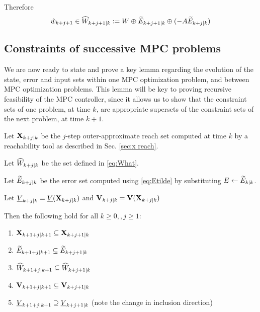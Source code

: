 Therefore 
\begin{equation}
\label{eq:What}
\hat{w}_{k+j+1} \in \widehat{W}_{k+j+1|k} := W \oplus \widetilde{E}_{k+j+1|k} \oplus(-A\widetilde{E}_{k+j|k})
\end{equation}

\subsection{Constraints of successive MPC problems}
\label{sec:inclusions statement}
We are now ready to state and prove a key lemma regarding the evolution of the state, error and input sets within one MPC optimization problem, and between MPC optimization problems. 
This lemma will be key to proving recursive feasibility of the MPC controller, since it allows us to show that the constraint sets of one problem, at time $k$, are appropriate supersets of the constraint sets of the next problem, at time $k+1$. 

\begin{lemma}
	\label{lem:set inclusions}
	Let $\mathbf{X}_{k+j|k}$ be the $j$-step outer-approximate reach set computed at time $k$ by a reachability tool as described in Sec. \ref{sec:x reach}.
	
	Let $\widehat{W}_{k+j|k}$ be the set defined in \eqref{eq:What}.
	
	Let $\widetilde{E}_{k+j|k}$ be the error set computed using \eqref{eq:Etilde} by substituting $E \leftarrow \widetilde{E}_{k|k}$.
	
	Let $\underline{V}_{k+j|k} = \underline{V}(\mathbf{X}_{k+j|k})$ and $\mathbf{V}_{k+j|k} = \mathbf{V}(\mathbf{X}_{k+j|k})$ 

Then the following hold for all $k \geq 0, ,j \geq 1$:
\begin{enumerate}
	\item $\mathbf{X}_{k+1+j|k+1} \subseteq \mathbf{X}_{k+j+1|k}$
	\label{set:X}
	\item $\widetilde{E}_{k+1+j|k+1} \subseteq \widetilde{E}_{k+j+1|k}$
	\label{set:tE}
	\item $\widehat{W}_{k+1+j|k+1} \subseteq \widehat{W}_{k+j+1|k}$
	\label{set:What}
	\item $\mathbf{V}_{k+1+j|k+1} \subseteq \mathbf{V}_{k+j+1|k}$
	\label{set:oaV}
	\item $\underline{V}_{k+1+j|k+1} \supseteq \underline{V}_{k+j+1|k}$ (note the change in inclusion direction)
	\label{set:uaV}		
\end{enumerate} 
\end{lemma} 

